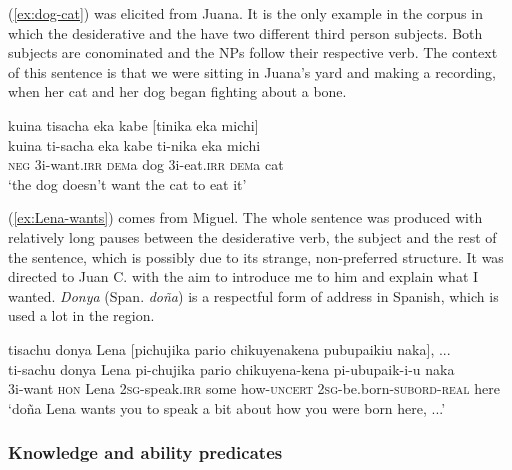(\ref{ex:dog-cat}) was elicited from Juana. It is the only example in the corpus in which the desiderative and the  have two different third person subjects. Both subjects are conominated and the NPs follow their respective verb. The context of this sentence is that we were sitting in Juana’s yard and making a recording, when her cat and her dog began fighting about a bone.

\ea\label{ex:dog-cat}
\begingl
\glpreamble kuina tisacha eka kabe \textup{[}tinika eka michi\textup{]}\\
\gla kuina ti-sacha eka kabe ti-nika eka michi\\
\glb \textsc{neg} 3i-want.\textsc{irr} \textsc{dem}a dog 3i-eat.\textsc{irr} \textsc{dem}a cat\\
\glft ‘the dog doesn’t want the cat to eat it’
\endgl
\trailingcitation{[jxx-e120430l-4.18]}
\xe

(\ref{ex:Lena-wants}) comes from Miguel. The whole sentence was produced with relatively long pauses between the desiderative verb, the subject and the rest of the sentence, which is possibly due to its strange, non-preferred structure. It was directed to Juan C. with the aim to introduce me to him and explain what I wanted. \textit{Donya}  (Span. \textit{doña}) is a respectful form of address in Spanish, which is used a lot in the region.

\ea\label{ex:Lena-wants}
\begingl
\glpreamble tisachu donya Lena \textup{[}pichujika pario chikuyenakena pubupaikiu naka\textup{]}, ...\\
\gla ti-sachu donya Lena pi-chujika pario chikuyena-kena pi-ubupaik-i-u naka\\
\glb 3i-want \textsc{hon} Lena 2\textsc{sg}-speak.\textsc{irr} some how-\textsc{uncert} 2\textsc{sg}-be.born-\textsc{subord}-\textsc{real} here\\
\glft ‘doña Lena wants you to speak a bit about how you were born here, ...’
\endgl
\trailingcitation{[mqx-p110826l.004-007]}
\xe
{}

\subsubsection{Knowledge and ability predicates}\label{sec:CC_KnowledgeAbility}

